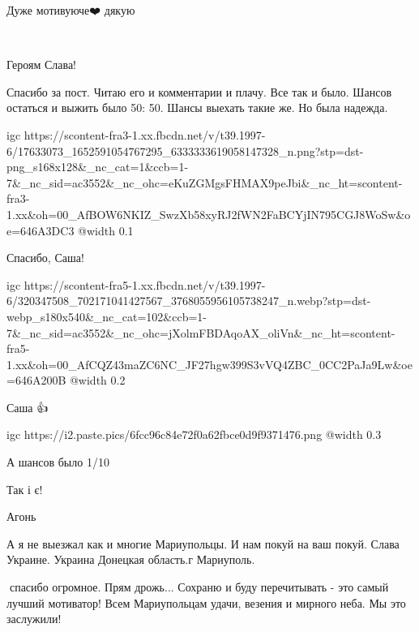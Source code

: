 Дуже мотивуюче❤️ дякую 💙💛


🙏🙏🙏💙💛🇺🇦


Героям Слава!


Спасибо за пост. Читаю его и комментарии и плачу. Все так и было. Шансов
остаться и выжить было 50: 50. Шансы выехать такие же. Но была надежда.


\ifcmt
  igc https://scontent-fra3-1.xx.fbcdn.net/v/t39.1997-6/17633073_1652591054767295_6333333619058147328_n.png?stp=dst-png_s168x128&_nc_cat=1&ccb=1-7&_nc_sid=ac3552&_nc_ohc=eKuZGMgsFHMAX9peJbi&_nc_ht=scontent-fra3-1.xx&oh=00_AfBOW6NKIZ_SwzXb58xyRJ2fWN2FaBCYjIN795CGJ8WoSw&oe=646A3DC3
	@width 0.1
\fi


Спасибо, Саша!


\ifcmt
  igc https://scontent-fra5-1.xx.fbcdn.net/v/t39.1997-6/320347508_702171041427567_3768055956105738247_n.webp?stp=dst-webp_s180x540&_nc_cat=102&ccb=1-7&_nc_sid=ac3552&_nc_ohc=jXolmFBDAqoAX_oliVn&_nc_ht=scontent-fra5-1.xx&oh=00_AfCQZ43maZC6NC_JF27hgw399S3vVQ4ZBC_0CC2PaJa9Lw&oe=646A200B
	@width 0.2
\fi


Саша 👍


\ifcmt
  igc https://i2.paste.pics/6fcc96c84e72f0a62fbce0d9f9371476.png
	@width 0.3
\fi


А шансов было 1/10


Так і є!


Агонь


А я не выезжал как и многие Мариупольцы. И нам покуй на ваш покуй. Слава
Украине. Украина Донецкая область.г Мариуполь.


🤗спасибо огромное. Прям дрожь... Сохраню и буду перечитывать - это самый
лучший мотиватор! Всем Мариупольцам удачи, везения и мирного неба. Мы это
заслужили!

